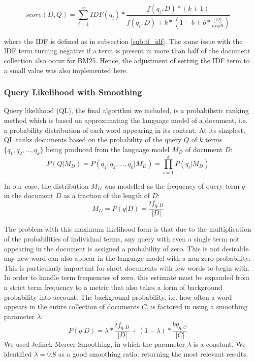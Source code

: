 $$ score(D, Q) = \sum_{i=1}^n IDF(q_i) * \frac{f(q_i, D)* (k + 1)}{f(q_i, D) + k * (1-b + b * \frac{|D|}{avgdl})}$$

where the IDF is defined as in subsection \ref{sub:tf_idf}. The same issue with the IDF term turning negative if a term is present in more than half of the document collection also occur for BM25. Hence, the adjustment of setting the IDF term to a small value was also implemented here.


\subsubsection{Query Likelihood with Smoothing} %
\label{ssub:query_likelihood_with_smoothing}

Query likelihood (QL), the final algorithm we included, is a probabilistic ranking method which is based on approximating the language model of a document, i.e. a probability distribution of each word appearing in its content. At its simplest, QL ranks documents based on the probability of the query $Q$ of $k$ terms $\{q_1,q_2,...,q_k\}$ being produced from the language model $M_D$ of document $D$:
\[ P(Q | M_D) = P(q_1,q_2,...,q_k | M_D) = \prod_{i=1}^{k} P(q_i | M_D)\]

In our case, the distribution $M_D$ was modelled as the frequency of query term $q$ in the document $D$ as a fraction of the length of $D$:
\[ M_D = P(q | D) = \frac{tf_{q,D}}{|D|} \]

The problem with this maximum likelihood form is that due to the multiplication of the probabilities of individual terms, any query with even a single term not appearing in the document is assigned a probability of zero. This is not desirable any new word can also appear in the language model with a non-zero probability. This is particularly important for short documents with few words to begin with. In order to handle term frequencies of zero, this estimate must be expanded from a strict term frequency to a metric that also takes a form of background probability into account. The background probability, i.e. how often a word appears in the entire collection of documents $C$, is factored in using a smoothing parameter $\lambda$:
\[P(q | D) = \lambda * \frac{tf_{q,D}}{|D|} + (1 - \lambda) * \frac{bg_{q,C}}{|C|}\]
We used Jelinek-Mercer Smoothing, in which the parameter $\lambda$ is a constant. We identified $\lambda = 0.8$ as a good smoothing ratio, returning the most relevant results.


